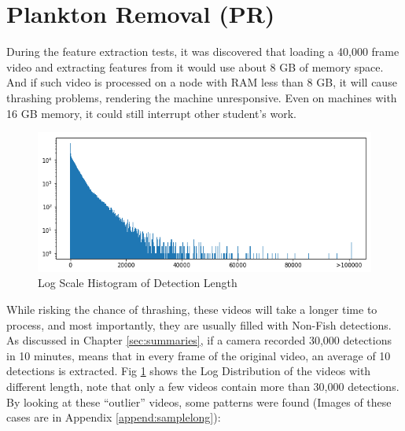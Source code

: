 \documentclass[bsc,logo,twoside,fullspacing,parskip]{infthesis}
\begin{document}
\section{Plankton Removal (PR)}
\label{sec:earlyremove}

During the feature extraction tests, it was discovered that loading a 40,000 frame video and extracting features from it would use about 8 GB of memory space. 
And if such video is processed on a node with RAM less than 8 GB, it will cause thrashing problems, rendering the machine unresponsive. 
Even on machines with 16 GB memory, it could still interrupt other student's work.

\begin{figure}[ht]
\centering
    \includegraphics[scale=0.45]{graph/frame_distribution.png}
    \caption{Log Scale Histogram of Detection Length}
    \label{fig:vidlength}
\end{figure}

While risking the chance of thrashing, these videos will take a longer time to process, and most importantly, they are usually filled with Non-Fish detections. 
As discussed in Chapter \ref{sec:summaries}, if a camera recorded 30,000 detections in 10 minutes, means that in every frame of the original video, an average of 10 detections is extracted. 
Fig \ref{fig:vidlength} shows the Log Distribution of the videos with different length, note that only a few videos contain more than 30,000 detections. 
By looking at these ``outlier'' videos, some patterns were found (Images of these cases are in Appendix \ref{append:samplelong}):
\end{document}

